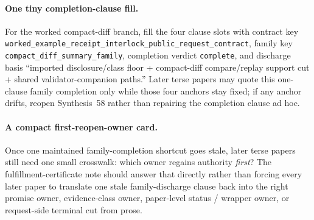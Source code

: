 \documentclass[11pt]{article}
\begin{document}
\paragraph{One tiny completion-clause fill.}
For the worked compact-diff branch, fill the four clause slots with contract key \nolinkurl{worked\_example\_receipt\_interlock\_public\_request\_contract}, family key \nolinkurl{compact\_diff\_summary\_family}, completion verdict \texttt{complete}, and discharge basis ``imported disclosure/class floor + compact-diff compare/replay support cut + shared validator-companion paths.'' Later terse papers may quote this one-clause family completion only while those four anchors stay fixed; if any anchor drifts, reopen Synthesis~58 rather than repairing the completion clause ad hoc.\cite{series:workedexample}

\paragraph{A compact first-reopen-owner card.}
Once one maintained family-completion shortcut goes stale, later terse papers still need one small crosswalk: which owner regains authority \emph{first}? The fulfillment-certificate note should answer that directly rather than forcing every later paper to translate one stale family-discharge clause back into the right promise owner, evidence-class owner, paper-level status / wrapper owner, or request-side terminal cut from prose.
\end{document}
